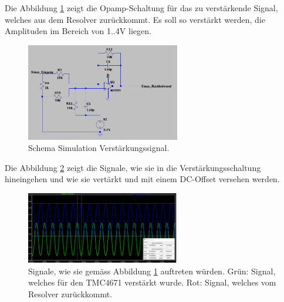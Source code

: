 Die Abbildung \ref{fig:Simulation_Verstaerkungssignal} zeigt die Opamp-Schaltung für das zu verstärkende Signal, welches aus dem Resolver zurückkommt. Es soll so verstärkt werden, die Amplituden im Bereich von 1..4V liegen.

\begin{figure}[h!]
	\centering
	\includegraphics[width=0.6\textwidth]{graphics/Simulation_Schema_Verstaerkungssignal.png}
	\caption{Schema Simulation Verstärkungssignal.}
	\label{fig:Simulation_Verstaerkungssignal}
\end{figure}

Die Abbildung \ref{fig:Simulation_Sinus2_Sinus3} zeigt die Signale, wie sie in die Verstärkungsschaltung hineingehen und wie sie vertärkt und mit einem DC-Offset versehen werden.

\begin{figure}[h!]
	\centering
	\includegraphics[width=0.6\textwidth]{graphics/Simulation_Sinus2_Sinus3.png}
	\caption{Signale, wie sie gemäss Abbildung \ref{fig:Simulation_Verstaerkungssignal} auftreten würden. Grün: Signal, welches für den TMC4671 verstärkt wurde. Rot: Signal, welches vom Resolver zurückkommt.}
	\label{fig:Simulation_Sinus2_Sinus3}
\end{figure}